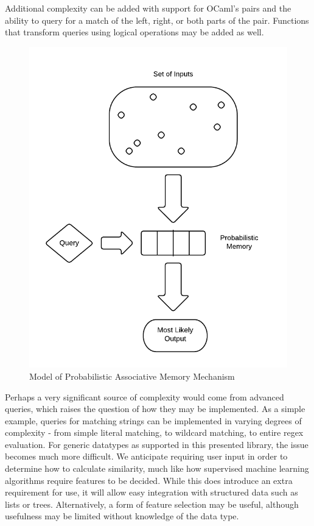 \documentclass{sig-alternate}
\begin{document}
Additional complexity can be added with support for OCaml's pairs and the 
ability to query for a match of the left, right, or both parts of the pair. Functions that transform
queries using logical operations may be added as well. 

\begin{figure}[H]
	\begin{center}
		\includegraphics[width=1\linewidth]{pammodel}
	\end{center}
	\vspace{-12pt}
	\caption{Model of Probabilistic Associative Memory Mechanism}
	\label{fig:pammodel}
\end{figure}

Perhaps a very significant source of complexity would come from advanced
queries, which raises the question
of how they may be implemented. 
As a simple example, queries for matching strings can be implemented in varying 
degrees of complexity - from simple literal matching, to wildcard matching, to
entire regex evaluation. For generic datatypes as supported in this presented
library, the issue becomes much more difficult. We anticipate requiring user
input in order to determine how to calculate similarity, much like how 
supervised machine learning algorithms require features to be decided. 
While this does
introduce an extra requirement for use, it will allow easy integration with
structured data such as lists or trees. Alternatively, a form of feature
selection may be useful, although usefulness may be limited without knowledge
of the data type. 
\end{document}
